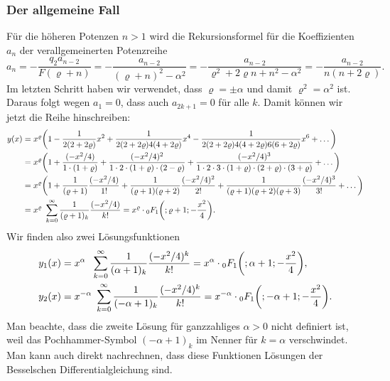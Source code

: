 \subsubsection{Der allgemeine Fall}
Für die höheren Potenzen $n>1$ wird die Rekursionsformel für die
Koeffizienten $a_n$ der verallgemeinerten Potenzreihe
\[
a_{n} =
-\frac{ q_2 a_{n-2} }{F(\varrho+n)}
=
-\frac{a_{n-2}}{(\varrho+n)^2-\alpha^2}
=
-\frac{a_{n-2}}{\varrho^2 + 2\varrho n+n^2-\alpha^2}
=
-\frac{a_{n-2}}{n(n+2\varrho)}.
\]
Im letzten Schritt haben wir verwendet, dass $\varrho=\pm\alpha$
und damit $\varrho^2=\alpha^2$ ist.
Daraus folgt wegen $a_1=0$, dass auch $a_{2k+1}=0$ für alle $k$.
Damit können wir jetzt die Reihe hinschreiben:
\begin{align*}
y(x)
&=
x^{\varrho}\biggl(
1
-
\frac{1}{2(2+2\varrho)} x^2
+
\frac{1}{2(2+2\varrho)4(4+2\varrho)} x^4
-
\frac{1}{2(2+2\varrho)4(4+2\varrho)6(6+2\varrho)} x^6
+
\dots
\biggr)
\\
&=
x^{\varrho}
\biggl(
1
+
\frac{(-x^2/4)}{1\cdot (1+\varrho)}
+
\frac{(-x^2/4)^2}{1\cdot 2\cdot (1+\varrho)\cdot(2-\varrho)}
+
\frac{(-x^2/4)^3}{1\cdot 2\cdot 3\cdot (1+\varrho)\cdot(2+\varrho)\cdot(3+\varrho)}
+
\dots
\biggr)
\\
&=
x^\varrho\biggl(
1
+
\frac{1}{(\varrho+1)}\frac{(-x^2/4)}{1!}
+
\frac{1}{(\varrho+1)(\varrho+2)}\frac{(-x^2/4)^2}{2!}
+
\frac{1}{(\varrho+1)(\varrho+2)(\varrho+3)}\frac{(-x^2/4)^3}{3!}
+
\dots
\biggr)
\\
&=
x^\varrho \sum_{k=0}^\infty
\frac{1}{(\varrho+1)_k} \frac{(-x^2/4)}{k!}
=
x^\varrho
\cdot
\mathstrut_0F_1\biggl(;\varrho+1;-\frac{x^2}{4}\biggr).
\end{align*}
Wir finden also zwei Lösungsfunktionen
\begin{align}
y_1(x)
&=
x^{\alpha\phantom{-}}
\sum_{k=0}^\infty
\frac{1}{(\alpha+1)_k}
\frac{(-x^2/4)^k}{k!}
=
x^\alpha
\cdot
\mathstrut_0F_1\biggl(;\alpha+1;-\frac{x^2}{4}\biggr),
\label{buch:differentialgleichunge:bessel:eqn:erste}
\\
y_2(x)
&=
x^{-\alpha} \sum_{k=0}^\infty
\frac{1}{(-\alpha+1)_k} \frac{(-x^2/4)^k}{k!}
=
x^{-\alpha}
\cdot
\mathstrut_0F_1\biggl(;-\alpha+1;-\frac{x^2}{4}\biggr).
\label{buch:differentialgleichunge:bessel:eqn:zweite}
\end{align}
Man beachte, dass die zweite Lösung für ganzzahliges $\alpha>0$ nicht
definiert ist, weil das Pochhammer-Symbol $(-\alpha+1)_k$ im Nenner für 
$k=\alpha$ verschwindet.
Man kann auch direkt nachrechnen, dass diese Funktionen Lösungen
der Besselschen Differentialgleichung sind.

